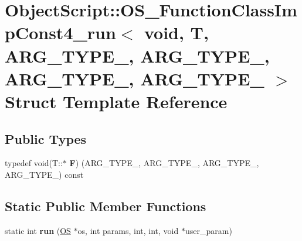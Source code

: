 \hypertarget{struct_object_script_1_1_o_s___function_class_imp_const4__run_3_01void_00_01_t_00_01_01_01_a_r_ge6fe66a9fea4b27c252b3ae88f24ca44}{}\section{Object\+Script\+:\+:O\+S\+\_\+\+Function\+Class\+Imp\+Const4\+\_\+run$<$ void, T, A\+R\+G\+\_\+\+T\+Y\+P\+E\+\_, A\+R\+G\+\_\+\+T\+Y\+P\+E\+\_, A\+R\+G\+\_\+\+T\+Y\+P\+E\+\_, A\+R\+G\+\_\+\+T\+Y\+P\+E\+\_ $>$ Struct Template Reference}
\label{struct_object_script_1_1_o_s___function_class_imp_const4__run_3_01void_00_01_t_00_01_01_01_a_r_ge6fe66a9fea4b27c252b3ae88f24ca44}
\subsection*{Public Types}
\begin{DoxyCompactItemize}
\item 
typedef void(T\+::$\ast$ {\bfseries F}) (A\+R\+G\+\_\+\+T\+Y\+P\+E\+\_, A\+R\+G\+\_\+\+T\+Y\+P\+E\+\_, A\+R\+G\+\_\+\+T\+Y\+P\+E\+\_, A\+R\+G\+\_\+\+T\+Y\+P\+E\+\_) const \hypertarget{struct_object_script_1_1_o_s___function_class_imp_const4__run_3_01void_00_01_t_00_01_01_01_a_r_ge6fe66a9fea4b27c252b3ae88f24ca44_ae9ca5eab322cc61c92be16fc54ceba4e}{}\label{struct_object_script_1_1_o_s___function_class_imp_const4__run_3_01void_00_01_t_00_01_01_01_a_r_ge6fe66a9fea4b27c252b3ae88f24ca44_ae9ca5eab322cc61c92be16fc54ceba4e}

\end{DoxyCompactItemize}
\subsection*{Static Public Member Functions}
\begin{DoxyCompactItemize}
\item 
static int {\bfseries run} (\hyperlink{class_object_script_1_1_o_s}{OS} $\ast$os, int params, int, int, void $\ast$user\+\_\+param)\hypertarget{struct_object_script_1_1_o_s___function_class_imp_const4__run_3_01void_00_01_t_00_01_01_01_a_r_ge6fe66a9fea4b27c252b3ae88f24ca44_acb0eeba990dc24d553d92beee2c48922}{}\label{struct_object_script_1_1_o_s___function_class_imp_const4__run_3_01void_00_01_t_00_01_01_01_a_r_ge6fe66a9fea4b27c252b3ae88f24ca44_acb0eeba990dc24d553d92beee2c48922}

\end{DoxyCompactItemize}



